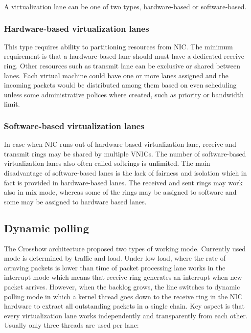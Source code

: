 \documentclass[11pt]{book}
\begin{document}
			A virtualization lane can be one of two types, hardware-based or software-based.
			
			\subsubsection{Hardware-based virtualization lanes}
			
			This type requires ability to partitioning resources from NIC. The minimum requirement is that a hardware-based lane should must have a dedicated receive ring.
			Other resources such as transmit lane can be exclusive or shared between lanes. Each virtual machine could have one or more lanes assigned and the incoming packets
			would be distributed among them based on even scheduling unless some administrative polices where created, such as priority or bandwidth limit.		
			
			\subsubsection{Software-based virtualization lanes}
			
			In case when NIC runs out of hardware-based virtualization lane, receive and transmit rings may be shared by multiple VNICs. The number of software-based virtualization 
			lanes also often called softrings is unlimited. The main disadvantage of software-based lanes is the lack of fairness and isolation which in fact is provided in hardware-based
			lanes. The received and sent rings may work also in mix mode, whereas some of the rings may be assigned to software and some may be assigned to hardware based lanes.	
			
		\subsection{Dynamic polling}	
			
			The Crossbow architecture proposed two types of working mode. Currently used mode is determined by traffic and load. Under low load, where the rate of arraving packets is lower than
			time of packet processing lane works in the interrupt mode which means that receive ring generates an interrupt when new packet arrives. However, when the backlog grows, the line 
			switches to dynamic polling mode in which a kernel thread goes down to the receive ring in the NIC hardware to extract all outstanding packets in a single chain. Key aspect is that 
			every virtualization lane works independently and transparently from each other. Usually only three threads are used per lane:
			
\end{document}
